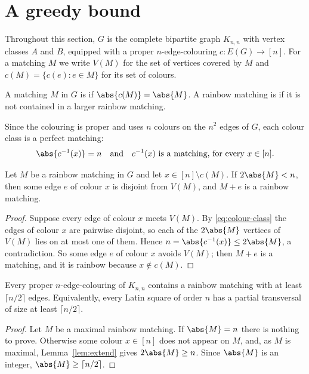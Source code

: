 \section{A greedy bound}\label{sec:greedy}

Throughout this section, $G$ is the complete bipartite graph $K_{n,n}$ with vertex classes $A$ and $B$, equipped with a proper $n$-edge-colouring $c\colon E(G)\to[n]$. For a matching $M$ we write $V(M)$ for the set of vertices covered by $M$ and $c(M)=\{c(e):e\in M\}$ for its set of colours.

\begin{definition}\label{def:rainbow}
A matching $M$ in $G$ is  if $\abs{c(M)}=\abs{M}$. A rainbow matching is  if it is not contained in a larger rainbow matching.
\end{definition}

Since the colouring is proper and uses $n$ colours on the $n^2$ edges of $G$, each colour class is a perfect matching:
\begin{equation}\label{eq:colour-class}
\abs{c^{-1}(x)}=n \quad\text{and}\quad c^{-1}(x)\ \text{is a matching, for every } x\in[n].
\end{equation}

\begin{lemma}\label{lem:extend}
Let $M$ be a rainbow matching in $G$ and let $x\in[n]\setminus c(M)$. If $2\abs{M}<n$, then some edge $e$ of colour $x$ is disjoint from $V(M)$, and $M+e$ is a rainbow matching.
\end{lemma}

\begin{proof}
Suppose every edge of colour $x$ meets $V(M)$. By \eqref{eq:colour-class} the edges of colour $x$ are pairwise disjoint, so each of the $2\abs{M}$ vertices of $V(M)$ lies on at most one of them. Hence $n=\abs{c^{-1}(x)}\leq 2\abs{M}$, a contradiction. So some edge $e$ of colour $x$ avoids $V(M)$; then $M+e$ is a matching, and it is rainbow because $x\notin c(M)$.
\end{proof}

\begin{theorem}\label{thm:greedy}
Every proper $n$-edge-colouring of $K_{n,n}$ contains a rainbow matching with at least $\lceil n/2\rceil$ edges. Equivalently, every Latin square of order $n$ has a partial transversal of size at least $\lceil n/2\rceil$.
\end{theorem}

\begin{proof}
Let $M$ be a maximal rainbow matching. If $\abs{M}=n$ there is nothing to prove. Otherwise some colour $x\in[n]$ does not appear on $M$, and, as $M$ is maximal, Lemma~\ref{lem:extend} gives $2\abs{M}\geq n$. Since $\abs{M}$ is an integer, $\abs{M}\geq\lceil n/2\rceil$.
\end{proof}


